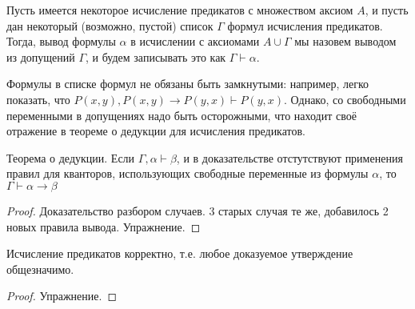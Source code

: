 \begin{definition}Пусть имеется некоторое исчисление предикатов с множеством
аксиом $A$, и пусть дан некоторый (возможно, пустой) список $\Gamma$ 
формул исчисления предикатов. Тогда, вывод формулы $\alpha$
в исчислении с аксиомами $A \cup \Gamma$ мы назовем выводом из 
допущений $\Gamma$, и будем записывать это как $\Gamma \vdash \alpha$.
\end{definition}

Формулы в списке формул не обязаны быть замкнутыми: например, легко 
показать, что $P(x,y), P(x,y)\rightarrow P(y,x) \vdash P(y,x)$. Однако,
со свободными переменными в допущениях надо быть осторожными, что 
находит своё отражение в теореме о дедукции для исчисления предикатов.

\begin{theorem}
Теорема о дедукции. Если $\Gamma, \alpha \vdash \beta$, 
и в доказательстве отстутствуют применения правил для кванторов, использующих
свободные переменные из формулы $\alpha$, то $\Gamma \vdash \alpha \rightarrow \beta$
\end{theorem}

\begin{proof}
Доказательство разбором случаев. 3 старых случая те же, добавилось 
2 новых правила вывода. Упражнение.
\end{proof}

\begin{theorem}
Исчисление предикатов корректно, т.е. любое доказуемое утверждение общезначимо.
\end{theorem}

\begin{proof}Упражнение.\end{proof}


